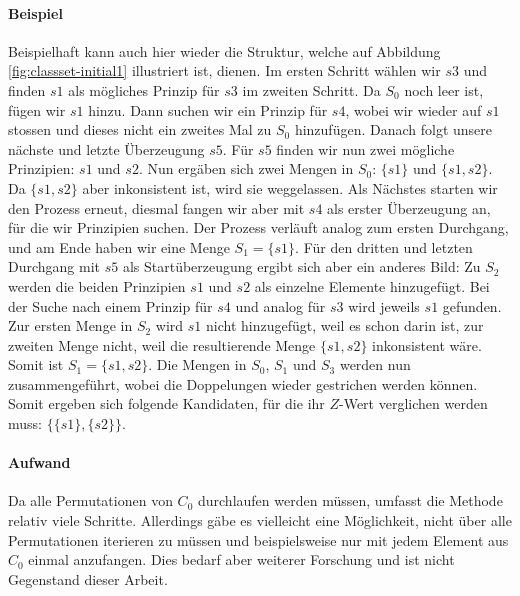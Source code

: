 \documentclass{article}
\begin{document}
\paragraph{Beispiel}
Beispielhaft kann auch hier wieder die Struktur, welche auf Abbildung \ref{fig:classset-initial1} illustriert ist, dienen. Im ersten Schritt wählen wir $s3$ und finden $s1$ als mögliches Prinzip für $s3$ im zweiten Schritt. Da $S_0$ noch leer ist, fügen wir $s1$ hinzu. Dann suchen wir ein Prinzip für $s4$, wobei wir wieder auf $s1$ stossen und dieses nicht ein zweites Mal zu $S_0$ hinzufügen. Danach folgt unsere nächste und letzte Überzeugung $s5$. Für $s5$ finden wir nun zwei mögliche Prinzipien: $s1$ und $s2$. Nun ergäben sich zwei Mengen in $S_0$: $\{s1\}$ und $\{s1, s2\}$. Da $\{s1, s2\}$ aber inkonsistent ist, wird sie weggelassen. Als Nächstes starten wir den Prozess erneut, diesmal fangen wir aber mit $s4$ als erster Überzeugung an, für die wir Prinzipien suchen. Der Prozess verläuft analog zum ersten Durchgang, und am Ende haben wir eine Menge $S_1 = \{s1\}$. Für den dritten und letzten Durchgang mit $s5$ als Startüberzeugung ergibt sich aber ein anderes Bild: Zu $S_2$ werden die beiden Prinzipien $s1$ und $s2$ als einzelne Elemente hinzugefügt. Bei der Suche nach einem Prinzip für $s4$ und analog für $s3$ wird jeweils $s1$ gefunden. Zur ersten Menge in $S_2$ wird $s1$ nicht hinzugefügt, weil es schon darin ist, zur zweiten Menge nicht, weil die resultierende Menge $\{s1,s2\}$ inkonsistent wäre. Somit ist $S_1 = \{{s1}, {s2}\}$. Die Mengen in $S_0$, $S_1$ und $S_3$ werden nun zusammengeführt, wobei die Doppelungen wieder gestrichen werden können. Somit ergeben sich folgende Kandidaten, für die ihr $Z$-Wert verglichen werden muss: $\{\{s1\}, \{s2\}\}$.

\paragraph{Aufwand}
Da alle Permutationen von $C_0$ durchlaufen werden müssen, umfasst die Methode relativ viele Schritte. Allerdings gäbe es vielleicht eine Möglichkeit, nicht über alle Permutationen iterieren zu müssen und beispielsweise nur mit jedem Element aus $C_0$ einmal anzufangen. Dies bedarf aber weiterer Forschung und ist nicht Gegenstand dieser Arbeit.
\end{document}
